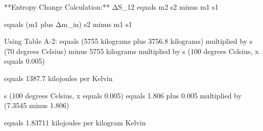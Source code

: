 **Entropy Change Calculation:**  
ΔS_12 equals m2 s2 minus m1 s1  

equals (m1 plus Δm_in) s2 minus m1 s1  

Using Table A-2:  
equals (5755 kilograms plus 3756.8 kilograms) multiplied by s (70 degrees Celsius) minus 5755 kilograms multiplied by s (100 degrees Celsius, x equals 0.005)  

equals 1387.7 kilojoules per Kelvin  

s (100 degrees Celsius, x equals 0.005) equals 1.806 plus 0.005 multiplied by (7.3545 minus 1.806)  

equals 1.83711 kilojoules per kilogram Kelvin